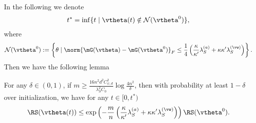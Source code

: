\documentclass{article}
\begin{document}
\noindent In the following we denote
\begin{equation}
    t^* = \inf\{t \mid \vtheta(t)\notin \mathcal{N}(\vtheta^0)\},
\end{equation}
where
\begin{equation}
    \mathcal{N}(\vtheta^0) := \left\{\theta \mid \norm{\mG(\vtheta) - \mG(\vtheta^0)}_F\leq \frac{1}{4}\left(\frac{\kappa}{\kappa'}\lambda_S^{(a)}+\kappa\kappa'\lambda_S^{(\vw)}\right)\right\}.
\end{equation}
Then we have the following lemma
\begin{lem}\label{lem:exp_RS}
    For any $\delta\in(0,1)$, if $m\geq\frac{16n^2d^2C_{\psi,d}^2}{\lambda_S^2C_0}\log\frac{4n^2}{\delta}$, then with probability at least $1-\delta$ over initialization, we have for any $t\in[0, t^*)$
    \begin{equation}
        \RS(\vtheta(t)) \leq \exp\left(-\frac{m}{n}\left(\frac{\kappa}{\kappa'}\lambda_S^{(a)}+\kappa\kappa'\lambda_S^{(\vw)}\right)\right)\RS(\vtheta^0).
    \end{equation}
\end{lem}
\end{document}
